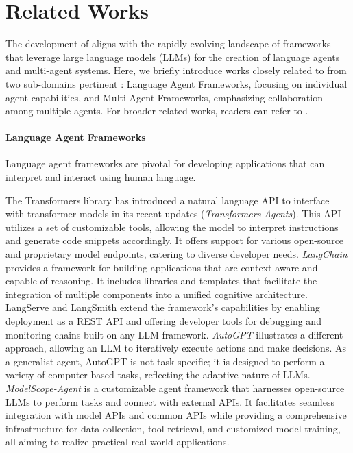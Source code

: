 \section{Related Works}
\label{sec:related_work}

The development of \ours aligns with the rapidly evolving landscape of frameworks that leverage large language models (LLMs) for the creation of language agents and multi-agent systems. Here, we briefly introduce works closely related to \ours from two sub-domains pertinent : Language Agent Frameworks, focusing on individual agent capabilities, and Multi-Agent Frameworks, emphasizing collaboration among multiple agents. For broader related works, readers can refer to \citep{agent-survey-1,agent-survey-2}.

\paragraph{Language Agent Frameworks}
Language agent frameworks are pivotal for developing applications that can interpret and interact using human language. 

The Transformers library \citep{transformers-agent} has introduced a natural language API to interface with transformer models in its recent updates (\textit{Transformers-Agents}). This API utilizes a set of customizable tools, allowing the model to interpret instructions and generate code snippets accordingly. It offers support for various open-source and proprietary model endpoints, catering to diverse developer needs.
\textit{LangChain} \citep{langchain} provides a framework for building applications that are context-aware and capable of reasoning. It includes libraries and templates that facilitate the integration of multiple components into a unified cognitive architecture. LangServe and LangSmith extend the framework's capabilities by enabling deployment as a REST API and offering developer tools for debugging and monitoring chains built on any LLM framework.
\textit{AutoGPT} \citep{autogpt} illustrates a different approach, allowing an LLM to iteratively execute actions and make decisions. As a generalist agent, AutoGPT is not task-specific; it is designed to perform a variety of computer-based tasks, reflecting the adaptive nature of LLMs.
\textit{ModelScope-Agent} \citep{modelscope-agent} is a customizable agent framework that harnesses open-source LLMs to perform tasks and connect with external APIs. It facilitates seamless integration with model APIs and common APIs while providing a comprehensive infrastructure for data collection, tool retrieval, and customized model training, all aiming to realize practical real-world applications.


